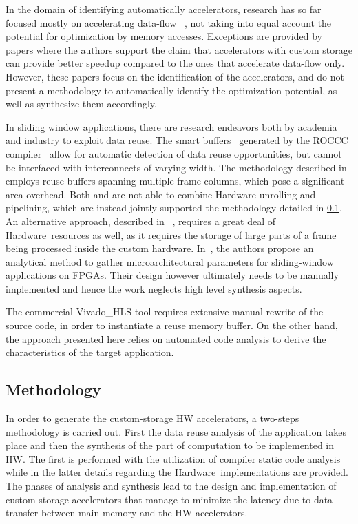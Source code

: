 \documentclass[]{usiinfthesis}
\newcommand{\HW}{{Hardware}}
\begin{document}
In the domain of identifying automatically accelerators, research has 
so far focused mostly on accelerating data-flow~\cite{GiaquintaMar15} \cite{GutinFeb12}, 
not taking into equal account the potential for optimization by memory accesses. 
Exceptions are provided by papers \cite{BiswasMar06} \cite{ HaaBOct2014}
where the authors support the claim that accelerators with custom
storage can provide better speedup compared to the ones that
accelerate data-flow only. However, these papers focus on the
identification of the accelerators, and do not present a methodology 
to automatically identify the optimization potential, as well as
synthesize them accordingly.\par
In sliding window applications, there are research endeavors
both by academia and industry to exploit data reuse. The smart
buffers~\cite{GuoJun04} generated by the ROCCC
compiler~\cite{VillarrealMay10} allow for automatic detection of data
reuse opportunities, but cannot be interfaced 
with interconnects of varying width.
%
The methodology
described in \cite{MeeusMar14} employs reuse buffers spanning multiple
frame columns, which pose a significant area
overhead. Both \cite{GuoJun04} and \cite{MeeusMar14} are not able
to combine Hardware unrolling and pipelining, which are instead jointly
supported the methodology detailed in \ref{sec:dr_meth}. An alternative 
approach, described in
~\cite{DongMar07}, requires a great deal of \HW\ resources as well, as it 
requires the storage of large parts of a frame being processed inside the custom
hardware.  In~\cite{LeeserApr06}, the authors propose an analytical
method to gather microarchitectural parameters for sliding-window
applications on FPGAs. Their design however ultimately needs to be
manually implemented and hence the work neglects high level synthesis
aspects.\par
%
The commercial Vivado\_HLS tool requires
extensive manual rewrite of the source code, in order to instantiate
a reuse memory buffer. On the other hand, the approach presented 
here relies on automated code
analysis to derive the characteristics of the target application.\par 



\subsection{Methodology}
\label{sec:dr_meth}

In order to generate the custom-storage HW accelerators, a two-steps methodology is 
carried out. First the data reuse analysis of the application takes place and 
then the synthesis of the part of computation to be implemented in HW.
The first is performed with the utilization of compiler static code analysis while
in the latter details regarding the \HW\ implementations are provided.
The phases of analysis and synthesis lead to the design and implementation of 
custom-storage accelerators that manage to minimize the latency due to data 
transfer between main memory and the HW accelerators.
\end{document}
